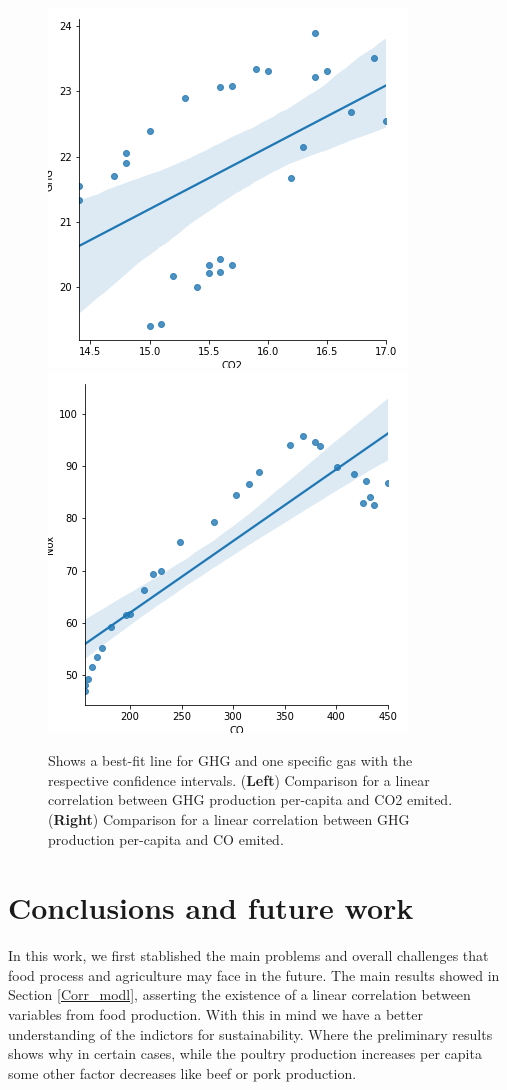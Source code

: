 \documentclass[11pt]{article}
\numberwithin{equation}{section}
\begin{document}
\begin{figure}[t]
\centering
\includegraphics[width=0.30\paperwidth, clip=true, trim=0mm 0mm 0mm 0mm]{figures/corr_CO2_GHG}
\includegraphics[width=0.30\paperwidth, clip=true, trim=0mm 0mm 0mm 0mm]{figures/corr_CO_NOX}

\caption{Shows  a best-fit line for GHG and one specific gas with the respective confidence intervals. (\textbf{Left}) Comparison for a linear correlation between GHG production per-capita and CO2  emited. (\textbf{Right}) Comparison for a linear correlation between GHG production per-capita and CO emited. 
}
\label{Example6fig}
\end{figure}
\section{Conclusions and future work} 
In this work, we first stablished the main problems and overall challenges that  food process and agriculture  may face in the future. The main results showed in Section  \ref{Corr_modl}, asserting the existence of a linear correlation between  variables from food production. With this in mind we have a better understanding of the indictors for sustainability. Where the preliminary results shows why in certain cases, while the poultry production increases per capita some other factor decreases like beef or pork production.
\end{document}
